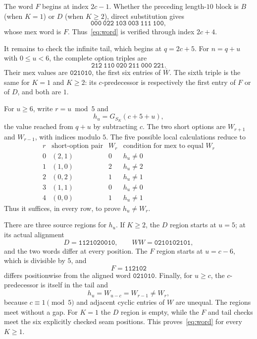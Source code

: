 \documentclass[11pt]{article}
\begin{document}
The word $F$ begins at index $2c-1$.  Whether the preceding length-$10$
block is $B$ (when $K=1$) or $D$ (when $K\geq2$), direct substitution
gives
\begin{equation}\label{eq:Ftable}
 \texttt{000}\ \texttt{022}\ \texttt{103}\ \texttt{003}\
 \texttt{111}\ \texttt{100},
\end{equation}
whose mex word is $F$.  Thus~\eqref{eq:word} is verified through index
$2c+4$.

It remains to check the infinite tail, which begins at
$q=2c+5$.  For $n=q+u$ with $0\leq u<6$, the complete option triples
are
\begin{equation}\label{eq:tailseam}
 \texttt{212}\ \texttt{110}\ \texttt{020}\ \texttt{211}\
 \texttt{000}\ \texttt{221}.
\end{equation}
Their mex values are $\texttt{021010}$, the first six entries of
$\overline W$.  The sixth triple is the same for $K=1$ and $K\geq2$:
its $c$-predecessor is respectively the first entry of $F$ or of $D$,
and both are $1$.

For $u\geq6$, write $r=u\bmod5$ and
\[
 h_u=G_{S_K}(c+5+u),
\]
the value reached from $q+u$ by subtracting $c$.  The two short options
are $W_{r+1}$ and $W_{r-1}$, with indices modulo $5$.  The five possible
local calculations reduce to
\[
\begin{array}{c|c|c|c}
r & \text{short-option pair} & W_r &
 \text{condition for mex to equal }W_r\\ \hline
0&(2,1)&0&h_u\ne0\\
1&(1,0)&2&h_u\ne2\\
2&(0,2)&1&h_u\ne1\\
3&(1,1)&0&h_u\ne0\\
4&(0,0)&1&h_u\ne1
\end{array}
\]
Thus it suffices, in every row, to prove $h_u\ne W_r$.

There are three source regions for $h_u$.  If $K\geq2$, the $D$ region
starts at $u=5$; at its actual alignment
\[
 D=\texttt{1121020010},\qquad WW=\texttt{0210102101},
\]
and the two words differ at every position.  The $F$ region starts at
$u=c-6$, which is divisible by $5$, and
\[
 F=\texttt{112102}
\]
differs positionwise from the aligned word $\texttt{021010}$.  Finally,
for $u\geq c$, the $c$-predecessor is itself in the tail and
\[
 h_u=W_{u-c}=W_{r-1}\ne W_r,
\]
because $c\equiv1\pmod5$ and adjacent cyclic entries of $W$ are
unequal.  The regions meet without a gap.  For $K=1$ the $D$ region is
empty, while the $F$ and tail checks meet the six explicitly checked
seam positions.  This proves~\eqref{eq:word} for every $K\geq1$.
\end{document}
